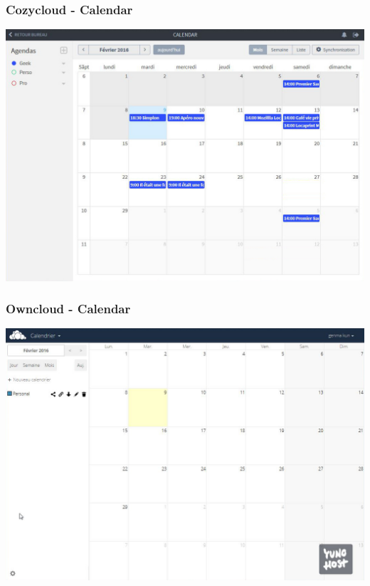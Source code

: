 \documentclass{beamer}
\begin{document}
\begin{frame}
\frametitle{Cozycloud - Calendar}
\includegraphics[scale=0.3] {./CozyCloud/CozyCloud_Calendar.jpg}
\end{frame}

\begin{frame}
\frametitle{Owncloud - Calendar}
\includegraphics[scale=0.3] {./Owncloud/Owncloud_Calendrier.jpg}
\end{frame}
\end{document}
